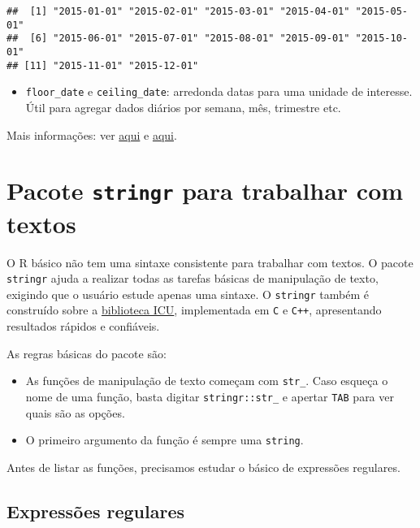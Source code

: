 \documentclass[]{book}
\providecommand{\tightlist}{%
  \setlength{\itemsep}{0pt}\setlength{\parskip}{0pt}}
\begin{document}
\begin{verbatim}
##  [1] "2015-01-01" "2015-02-01" "2015-03-01" "2015-04-01" "2015-05-01"
##  [6] "2015-06-01" "2015-07-01" "2015-08-01" "2015-09-01" "2015-10-01"
## [11] "2015-11-01" "2015-12-01"
\end{verbatim}

\begin{itemize}
\tightlist
\item
  \texttt{floor\_date} e \texttt{ceiling\_date}: arredonda datas para
  uma unidade de interesse. Útil para agregar dados diários por semana,
  mês, trimestre etc.
\end{itemize}

Mais informações: ver
\href{https://cran.r-project.org/web/packages/lubridate/vignettes/lubridate.html}{aqui}
e
\href{https://www.jstatsoft.org/index.php/jss/article/view/v040i03/v40i03.pdf}{aqui}.

\section{\texorpdfstring{Pacote \texttt{stringr} para trabalhar com
textos}{Pacote stringr para trabalhar com textos}}\label{pacote-stringr-para-trabalhar-com-textos}

O R básico não tem uma sintaxe consistente para trabalhar com textos. O
pacote \texttt{stringr} ajuda a realizar todas as tarefas básicas de
manipulação de texto, exigindo que o usuário estude apenas uma sintaxe.
O \texttt{stringr} também é construído sobre a
\href{http://site.icu-project.org/}{biblioteca ICU}, implementada em
\texttt{C} e \texttt{C++}, apresentando resultados rápidos e confiáveis.

As regras básicas do pacote são:

\begin{itemize}
\tightlist
\item
  As funções de manipulação de texto começam com \texttt{str\_}. Caso
  esqueça o nome de uma função, basta digitar \texttt{stringr::str\_} e
  apertar \texttt{TAB} para ver quais são as opções.
\item
  O primeiro argumento da função é sempre uma \texttt{string}.
\end{itemize}

Antes de listar as funções, precisamos estudar o básico de expressões
regulares.

\subsection{Expressões regulares}\label{expressoes-regulares}
\end{document}
